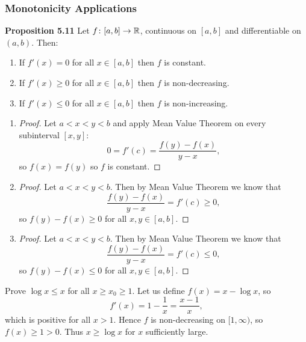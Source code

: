 \documentclass[class=article, crop=false]{standalone}
\begin{document}
  \subsubsection{Monotonicity Applications}
  \textbf{Proposition 5.11} Let $f\colon [a, b]\to \mathbb{R}$, continuous on $[a, b]$ and differentiable on $(a, b)$. Then:
  \begin{enumerate}[label=(\roman*)]
    \item If $f'(x) = 0$ for all $x\in [a, b]$ then $f$ is constant.
    \item If $f'(x) \geq 0$ for all $x\in [a, b]$ then $f$ is non-decreasing.
    \item If $f'(x) \leq 0$ for all $x\in [a, b]$ then $f$ is non-increasing.
  \end{enumerate}
  \begin{enumerate}[label=(\roman*)]
    \item
    \begin{proof}
      Let $a < x < y < b$ and apply Mean Value Theorem on every subinterval $[x, y]$:
      \[
        0 = f'(c) = \frac{f(y) - f(x)}{y - x},
      \]
      so $f(x) = f(y)$ so $f$ is constant.
    \end{proof}
    \item 
    \begin{proof}
      Let $a < x < y < b$. Then by Mean Value Theorem we know that
      \[
        \frac{f(y) - f(x)}{y - x} = f'(c)\geq 0,
      \]
      so $f(y) - f(x)\geq 0$ for all $x, y\in [a, b]$.
    \end{proof}
    \item 
    \begin{proof}
      Let $a < x < y < b$. Then by Mean Value Theorem we know that
      \[
        \frac{f(y) - f(x)}{y - x} = f'(c)\leq 0,
      \]
      so $f(y) - f(x)\leq 0$ for all $x, y\in [a, b]$.
    \end{proof}
  \end{enumerate}
  \begin{example}{}
    Prove $\log x\leq x$ for all $x\geq x_0\geq 1$. Let us define $f(x) = x - \log x$, so
    \[
      f'(x) = 1 - \frac{1}{x} = \frac{x - 1}{x},
    \]
    which is positive for all $x > 1$. Hence $f$ is non-decreasing on $[1, \infty)$, so $f(x)\geq 1 > 0$. Thus $x\geq \log x$ for $x$ sufficiently large.
  \end{example}
\end{document}
